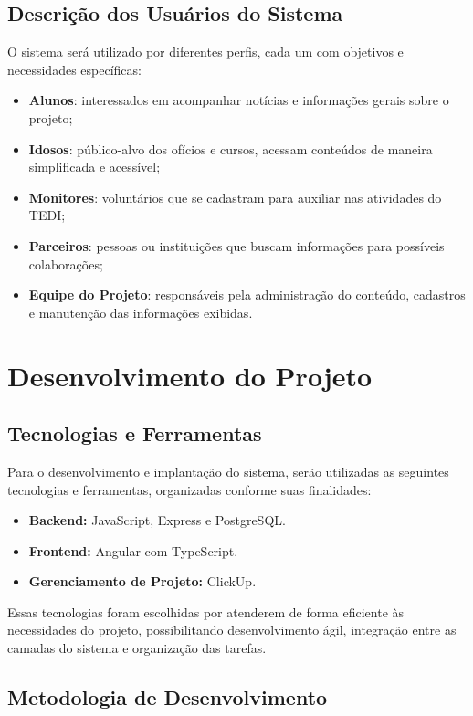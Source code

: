 \documentclass[a4paper,12pt]{article}
\begin{document}
\subsection{Descrição dos Usuários do Sistema}
O sistema será utilizado por diferentes perfis, cada um com objetivos e necessidades específicas:
\begin{itemize}
    \item \textbf{Alunos}: interessados em acompanhar notícias e informações gerais sobre o projeto;
    \item \textbf{Idosos}: público-alvo dos ofícios e cursos, acessam conteúdos de maneira simplificada e acessível;
    \item \textbf{Monitores}: voluntários que se cadastram para auxiliar nas atividades do TEDI;
    \item \textbf{Parceiros}: pessoas ou instituições que buscam informações para possíveis colaborações;
    \item \textbf{Equipe do Projeto}: responsáveis pela administração do conteúdo, cadastros e manutenção das informações exibidas.
\end{itemize}

\newpage
\section{Desenvolvimento do Projeto}

\subsection{Tecnologias e Ferramentas}

Para o desenvolvimento e implantação do sistema, serão utilizadas as seguintes tecnologias e ferramentas, organizadas conforme suas finalidades:

\begin{itemize}
    \item \textbf{Backend:} JavaScript, Express e PostgreSQL.
    \item \textbf{Frontend:} Angular com TypeScript.
    \item \textbf{Gerenciamento de Projeto:} ClickUp.
\end{itemize}

Essas tecnologias foram escolhidas por atenderem de forma eficiente às necessidades do projeto, possibilitando desenvolvimento ágil, integração entre as camadas do sistema e organização das tarefas.

\subsection{Metodologia de Desenvolvimento}
\end{document}
